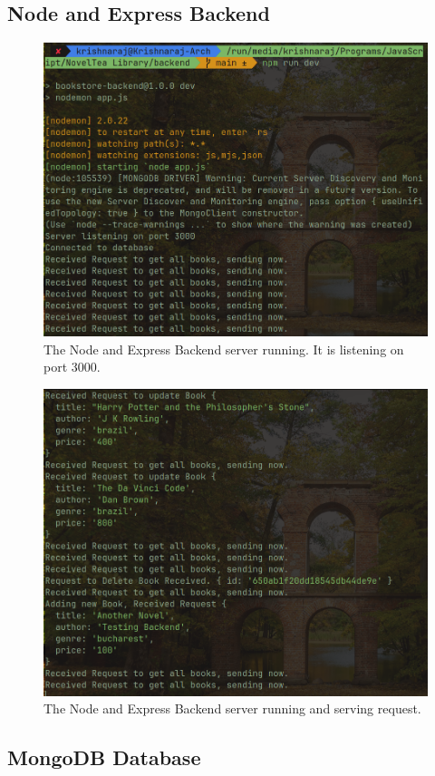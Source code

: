 \documentclass[11pt]{article}
\begin{document}
\subsection{Node and Express Backend}

\begin{figure}[H]
    \centering
    \includegraphics[width=.70\textwidth]{Screenshots/backend 1.png}
    \caption{The Node and Express Backend server running. It is listening on port 3000.}
\end{figure}
\begin{figure}[H]
    \centering
    \includegraphics[width=.70\textwidth]{Screenshots/backend 2.png}
    \caption{The Node and Express Backend server running and serving request. }
\end{figure}

\subsection{MongoDB Database}
\end{document}
